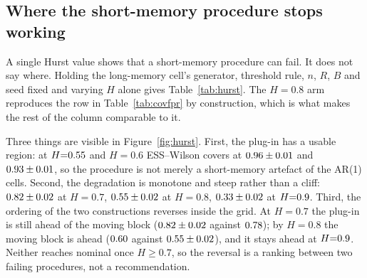 \documentclass[a4paper,fleqn]{cas-dc}
\newcommand{\tabwidth}{\columnwidth}
\newcommand{\tabbody}{\small\setlength{\tabcolsep}{3.5pt}\renewcommand{\arraystretch}{1.08}}
\newcommand{\fulltab}{\renewcommand{\tabwidth}{\textwidth}\tabbody}
\begin{document}
\begin{table}[!t]
\centering
\caption{Recall coverage, same run and cell format as Table~\ref{tab:covfpr}. The ESS plug-in is
the interval on attack indicators after benign gaps are removed. The episode bootstrap is a
different procedure.}\label{tab:covrec}
\fulltab

\end{table}

\begin{table}[!t]
\centering
\caption{AUC coverage, same run and cell format. The moving-block column resamples label and
score jointly inside each temporal block, so their local association is kept; positive and negative
scores are not drawn as two independent samples. There is no ESS plug-in for the
AUC.}\label{tab:covauc}
\fulltab

\end{table}

\begin{table}[!t]
\centering
\caption{The factorial at $n{=}20000$, $R{=}500$. The episode bootstrap and long memory were not rerun at this $n$. From
\texttt{results/coverage\_sim\_n20000.csv}.}\label{tab:covn}
\fulltab

\end{table}

\subsection{Where the short-memory procedure stops working}\label{sec:hurst}
A single Hurst value shows that a short-memory procedure can fail. It does not say where. Holding
the long-memory cell's generator, threshold rule, $n$, $R$, $B$ and seed fixed and varying $H$ alone
gives Table~\ref{tab:hurst}. The $H{=}0.8$ arm reproduces the row in Table~\ref{tab:covfpr} by
construction, which is what makes the rest of the column comparable to it.

Three things are visible in Figure~\ref{fig:hurst}. First, the plug-in has a usable region: at $H{=}0.55$ and $H{=}0.6$
ESS--Wilson covers at $0.96\pm0.01$ and $0.93\pm0.01$, so the procedure is not merely a short-memory
artefact of the AR(1) cells. Second, the degradation is monotone and steep rather than a cliff:
$0.82\pm0.02$ at $H{=}0.7$, $0.55\pm0.02$ at $H{=}0.8$, $0.33\pm0.02$ at $H{=}0.9$. Third, the
ordering of the two constructions reverses inside the grid. At $H{=}0.7$ the plug-in is still ahead
of the moving block ($0.82\pm0.02$ against $0.78$); by $H{=}0.8$ the moving block is ahead
($0.60$ against $0.55\pm0.02$), and it stays ahead at $H{=}0.9$. Neither reaches
nominal once $H\ge0.7$, so the reversal is a ranking between two failing procedures, not a
recommendation.
\end{document}
